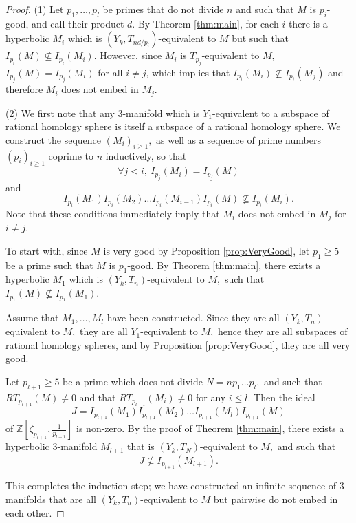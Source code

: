 \documentclass[10pt,a4paper]{amsart}
\newcommand{\Z}{\mathbb{Z}}
\begin{document}
\begin{proof}
	(1) Let $p_1,\dots, p_l$ be primes that do not divide $n$ and such that $M$ is $p_i$-good, and call their product $d$.  By Theorem \ref{thm:main}, for each $i$ there is a hyperbolic $M_i$ which is $(Y_k,T_{nd/p_i})$-equivalent to $M$ but such that $I_{p_i}(M)\nsubseteq I_{p_i}(M_i)$. However, since $M_i$ is $T_{p_j}$-equivalent to $M$, $I_{p_j}(M)=I_{p_j}(M_i)$ for all $i\neq j$, which implies that $I_{p_i}(M_i)\nsubseteq I_{p_i}(M_j)$ and therefore $M_i$ does not embed in $M_j$.
	
	(2) We first note that any $3$-manifold which is $Y_1$-equivalent to a subspace of rational homology sphere is itself a subspace of a rational homology sphere. We construct the sequence $(M_i)_{i\geq 1},$ as well as a sequence of prime numbers $(p_i)_{i\geq 1}$ coprime to $n$ inductively, so that 
	\[\forall j<i, \ I_{p_j}(M_i)=I_{p_j}(M)\]
	and
	\[ I_{p_i}(M_1)I_{p_i}(M_2)\ldots I_{p_i}(M_{i-1})I_{p_i}(M) \nsubseteq I_{p_i}(M_i).\]
	Note that these conditions immediately imply that $M_i$ does not embed in $M_j$ for $i\neq j.$
	
	
	To start with, since $M$ is very good by Proposition \ref{prop:VeryGood}, let $p_1\geq 5$ be a prime such that $M$ is $p_1$-good. By Theorem \ref{thm:main}, there exists a hyperbolic $M_1$ which is $(Y_k,T_n)$-equivalent to $M,$ such that $I_{p_1}(M)\nsubseteq I_{p_1}(M_1).$
	
	 Assume that $M_1,\ldots, M_l$ have been constructed. Since they are all $(Y_k,T_n)$-equivalent to $M,$ they are all $Y_1$-equivalent to $M,$ hence they are all subspaces of rational homology spheres, and by Proposition \ref{prop:VeryGood}, they are all very good.
	
	Let $p_{l+1}\geq 5$ be a prime which does not divide $N=np_1\ldots p_l,$ and such that $RT_{p_{l+1}}(M)\neq 0$ and that $RT_{p_{l+1}}(M_i)\neq 0$ for any $i\leq l.$ Then the ideal 
	$$J=I_{p_{l+1}}(M_1)I_{p_{l+1}}(M_2)\ldots I_{p_{l+1}}(M_{l})I_{p_{l+1}}(M)$$ of $\Z[\zeta_{p_{l+1}},\frac{1}{p_{l+1}}]$ is non-zero. By the proof of Theorem \ref{thm:main}, there exists a hyperbolic $3$-manifold $M_{l+1}$ that is $(Y_k,T_N)$-equivalent to $M,$ and such that
	$$J\nsubseteq I_{p_{l+1}}(M_{l+1}).$$
	
	This completes the induction step; we have constructed an infinite sequence of $3$-manifolds that are all $(Y_k,T_n)$-equivalent to $M$ but pairwise do not embed in each other.
\end{proof}
\end{document}

